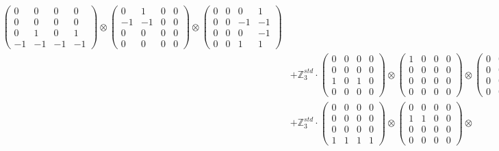\documentclass{article}
\begin{document}
{\begin{align}
            \begin{pmatrix} 0 & 0 & 0 & 0 \\ 0 & 0 & 0 & 0 \\ 0 & 1 & 0 & 1 \\ -1 & -1 & -1 & -1 \end{pmatrix} \otimes 
            \begin{pmatrix} 0 & 1 & 0 & 0 \\ -1 & -1 & 0 & 0 \\ 0 & 0 & 0 & 0 \\ 0 & 0 & 0 & 0 \end{pmatrix} \otimes 
            \begin{pmatrix} 0 & 0 & 0 & 1 \\ 0 & 0 & -1 & -1 \\ 0 & 0 & 0 & -1 \\ 0 & 0 & 1 & 1 \end{pmatrix} \\ 
        &+ \label{Rs4-Rc15-Solution-1-c7} \mathbb{Z}_3^{std} \cdot 
            \begin{pmatrix} 0 & 0 & 0 & 0 \\ 0 & 0 & 0 & 0 \\ 1 & 0 & 1 & 0 \\ 0 & 0 & 0 & 0 \end{pmatrix} \otimes 
            \begin{pmatrix} 1 & 0 & 0 & 0 \\ 0 & 0 & 0 & 0 \\ 0 & 0 & 0 & 0 \\ 0 & 0 & 0 & 0 \end{pmatrix} \otimes 
            \begin{pmatrix} 0 & 0 & 1 & 0 \\ 0 & 0 & 0 & 0 \\ 0 & 0 & -1 & 0 \\ 0 & 0 & 0 & 0 \end{pmatrix} \\ 
        &+ \label{Rs4-Rc15-Solution-1-c8} \mathbb{Z}_3^{std} \cdot 
            \begin{pmatrix} 0 & 0 & 0 & 0 \\ 0 & 0 & 0 & 0 \\ 0 & 0 & 0 & 0 \\ 1 & 1 & 1 & 1 \end{pmatrix} \otimes 
            \begin{pmatrix} 0 & 0 & 0 & 0 \\ 1 & 1 & 0 & 0 \\ 0 & 0 & 0 & 0 \\ 0 & 0 & 0 & 0 \end{pmatrix} \otimes 

\end{align}}
\end{document}
